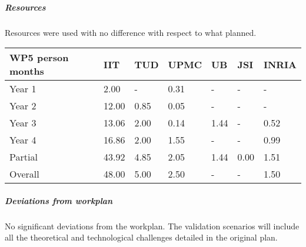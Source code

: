 
\subparagraph*{Resources}

Resources were used with no difference with respect to what planned. 

\begin{center}
\begin{tabular}{|C{1.5cm}|C{1.5cm}|C{1.5cm}|C{2cm}|C{2cm}|C{2cm}|C{2cm}|}
\hline
\footnotesize \textbf{WP5 person months}& \footnotesize \textbf{IIT}&\footnotesize \textbf{TUD}&\footnotesize \textbf{UPMC}& \footnotesize \textbf{UB} &\footnotesize \textbf{JSI} & \footnotesize \textbf{INRIA} \\ \hline
\footnotesize Year 1  &  2.00  & -    & 0.31 & -    & - & -     \\  \hline
\footnotesize Year 2  &  12.00 & 0.85 & 0.05 & -    & - & -     \\  \hline
\footnotesize Year 3  &  13.06 & 2.00 & 0.14 & 1.44 & - & 0.52 \\ \hline
\footnotesize Year 4  & 16.86 &  2.00 &  1.55 &  -     &  -     &  0.99 \\   \hline
\footnotesize Partial & 43.92 &  4.85 &  2.05 &  1.44 &  0.00 &  1.51    \\
\hline \hline
\footnotesize Overall &  48.00 & 5.00 & 2.50 & - & - & 1.50 \\ \hline
\end{tabular}
\end{center}

\subparagraph*{Deviations from workplan} 
No significant deviations from the workplan. The validation scenarios will include all the theoretical and technological challenges detailed in the original plan.
